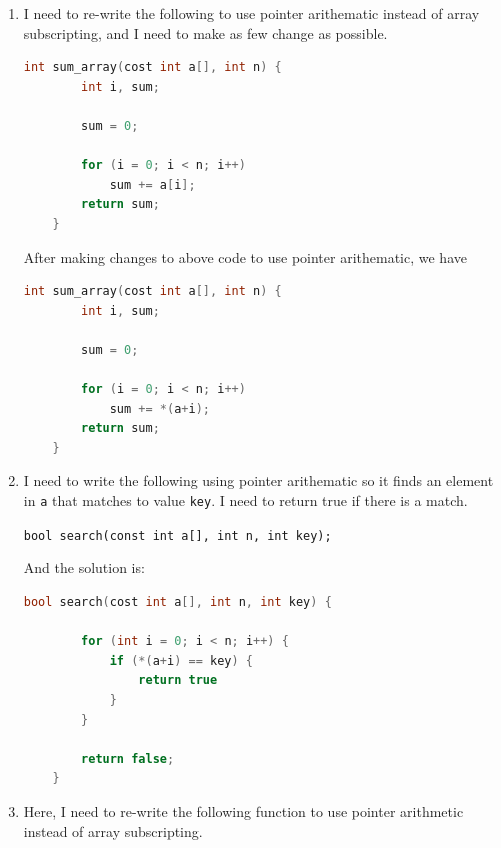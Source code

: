 \documentclass[12pt]{article}
\begin{document}
\begin{enumerate}[1.]
    \item

    I need to re-write the following to use pointer arithematic instead
    of array subscripting, and I need to make as few change as possible.

    \bigskip

\begin{lstlisting}[language=c]
    int sum_array(cost int a[], int n) {
        int i, sum;

        sum = 0;

        for (i = 0; i < n; i++)
            sum += a[i];
        return sum;
    }
\end{lstlisting}

    \bigskip

    After making changes to above code to use pointer arithematic, we have

\begin{lstlisting}[language=c]
    int sum_array(cost int a[], int n) {
        int i, sum;

        sum = 0;

        for (i = 0; i < n; i++)
            sum += *(a+i);
        return sum;
    }
\end{lstlisting}

    \item

    I need to write the following using pointer arithematic so it finds an element
    in \texttt{a} that matches to value \texttt{key}. I need to return
    true if there is a match.

    \bigskip

    \texttt{bool search(const int a[], int n, int key);}

    \bigskip

    And the solution is:

\begin{lstlisting}[language=c]
    bool search(cost int a[], int n, int key) {

        for (int i = 0; i < n; i++) {
            if (*(a+i) == key) {
                return true
            }
        }

        return false;
    }
\end{lstlisting}

    \item

    Here, I need to re-write the following function to use pointer arithmetic
    instead of array subscripting.


\end{enumerate}
\end{document}
